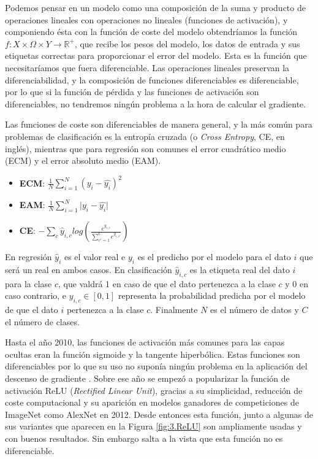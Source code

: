 Podemos pensar en un modelo como una composición de la suma y producto de operaciones lineales con operaciones no lineales (funciones de activación), y componiendo ésta con la función de coste del modelo obtendríamos la función $f: X \times \Omega \times Y \rightarrow \mathbb{R^+}$, que recibe los pesos del modelo, los datos de entrada y sus etiquetas correctas para proporcionar el error del modelo. Esta es la función que necesitaríamos que fuera diferenciable. Las operaciones lineales preservan la diferenciabilidad, y la composición de funciones diferenciables es diferenciable, por lo que si la función de pérdida y las funciones de activación son diferenciables, no tendremos ningún problema a la hora de calcular el gradiente.

Las funciones de coste son diferenciables de manera general, y la más común para problemas de clasificación es la entropía cruzada (o \textit{Cross Entropy}, CE, en inglés), mientras que para regresión son comunes el error cuadrático medio (ECM) y el error absoluto medio (EAM).

\begin{itemize}

    \item \textbf{ECM}: $\frac{1}{N} \sum_{i=1}^N \left (y_i - \hat{y_i} \right ) ^2$ 

    \item \textbf{EAM}: $\frac{1}{N} \sum_{i=1}^N \lvert y_i - \hat{y_i} \rvert$ 	

    \item \textbf{CE}: $  - \sum_c \hat{y}_{i,c} log(\frac{e^{y_{i,c}}}{\sum_{c'=1}^C e^{y_{i,c'}}})$
\end{itemize}

En regresión $\hat{y}_i$ es el valor real  e $y_i$ es el predicho por el modelo para el dato $i$ que será un real en ambos casos. En clasificación $\hat{y}_{i,c}$ es la etiqueta real del dato $i$ para la clase $c$, que valdrá 1 en caso de que el dato pertenezca a la clase $c$ y 0 en caso contrario, e $y_{i,c} \in [0,1]$ representa la probabilidad predicha por el modelo de que el dato $i$ pertenezca a la clase $c$. Finalmente $N$ es el número de datos y $C$ el número de clases. 


Hasta el año 2010, las funciones de activación más comunes para las capas ocultas eran la función sigmoide y la tangente hiperbólica. Estas funciones son diferenciables por lo que su uso no suponía ningún problema en la aplicación del descenso de gradiente \cite{EffBackProp}. Sobre ese año se empezó a popularizar la función de activación ReLU (\textit{Rectified Linear Unit}), gracias a su simplicidad, reducción de coste computacional y su aparición en modelos ganadores de competiciones de ImageNet como AlexNet en 2012. Desde entonces esta función, junto a algunas de sus variantes que aparecen en la Figura \ref{fig:3.ReLU} son ampliamente usadas y con buenos resultados. Sin embargo salta a la vista que esta función no es diferenciable.


